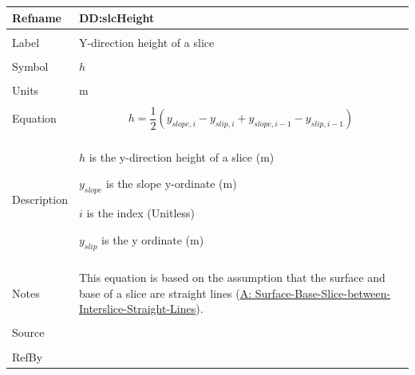 \documentclass[12pt]{article}
\begin{document}
\noindent \begin{minipage}{\textwidth}
\begin{tabular}{p{} p{}}
\toprule \textbf{Refname} & \textbf{DD:slcHeight}
\label{DD:slcHeight}
\\ \midrule \\
Label & Y-direction height of a slice
        \\ \midrule \\
        Symbol & $h$
                 \\ \midrule \\
                 Units & m
                         \\ \midrule \\
                         Equation & \begin{displaymath}
                                    h=\frac{1}{2} \left({y_{slope,i}}-{y_{slip,i}}+{y_{slope,i-1}}-{y_{slip,i-1}}\right)
                                    \end{displaymath}
                                    \\ \midrule \\
                                    Description & \begin{symbDescription}
                                                  \item{$h$ is the y-direction height of a slice (m)}
                                                  \item{${y_{slope}}$ is the slope y-ordinate (m)}
                                                  \item{$i$ is the index (Unitless)}
                                                  \item{${y_{slip}}$ is the y ordinate (m)}
                                                  \end{symbDescription}
                                                  \\ \midrule \\
                                                  Notes & This equation is based on the assumption that the surface and base of a slice are straight lines (\hyperref[A:Surface-Base-Slice-between-Interslice-Straight-Lines]{A: Surface-Base-Slice-between-Interslice-Straight-Lines}).
                                                          \\ \midrule \\
                                                          Source & \cite{fredlund1977}
                                                                   \\ \midrule \\
                                                                   RefBy & 
\\ \bottomrule \end{tabular}
\end{minipage}
\par~
\end{document}
